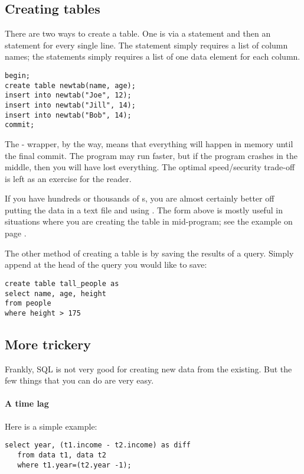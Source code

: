 \subsection{Creating tables} There are two ways to create a table. One
is via  a  statement and then an  statement
for every single line. The  statement simply requires a
list of column names; the  statements simply requires a
list of one data element for each column.
\begin{lstlisting}
begin;
create table newtab(name, age);
insert into newtab("Joe", 12);
insert into newtab("Jill", 14);
insert into newtab("Bob", 14);
commit;
\end{lstlisting}

The - wrapper, by the way, means that everything
will happen in memory until the final commit. The program may run
faster, but if the program crashes in the middle, then you will have
lost everything.  The optimal speed/security trade-off is left as an
exercise for the reader.

If you have hundreds or thousands of s, you are almost certainly better off putting the data
in a text file and using . The form
above is mostly useful in situations where you are creating the table in mid-program; see the example on page \pageref{createeg}.


The other method of creating a table is by saving the results of a
query. Simply append  at the head of the
query you would like to save: 
\begin{lstlisting}
create table tall_people as
select name, age, height 
from people
where height > 175
\end{lstlisting}



\subsection{More trickery} Frankly, SQL is not very good for
creating new data from the existing. But the few things that you can do
are very easy.

\paragraph{A time lag} Here is a simple example:
\begin{lstlisting}
select year, (t1.income - t2.income) as diff
   from data t1, data t2
   where t1.year=(t2.year -1);
\end{lstlisting}


